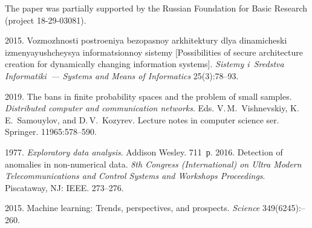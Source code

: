    
  



 \Ack
   \noindent
   The paper was partially supported by the Russian Foundation for Basic Research (project  
18-29-03081).



  \begin{multicols}{2}

\renewcommand{\bibname}{\protect\rmfamily References}

{\small\frenchspacing
 {%
 \begin{thebibliography}{9}

 2015. Vozmozhnosti 
postroeniya 
bezopasnoy arkhitektury dlya dinamicheski izmenyayushcheysya informatsionnoy sistemy 
[Possibilities of secure architecture creation for dynamically changing information systems]. 
\textit{Sistemy i~Sredstva Informatiki~--- Systems and Means of Informatics} 25(3):78--93.

 2019. 
The bans in finite probability spaces and 
the problem of small samples. \textit{Distributed computer and communication networks}.
Eds. V.\,M.~Vishnevskiy, 
K.\,E.~Samouylov, and D.\,V.~Kozyrev. Lecture notes
in computer science ser. Springer. 11965:578--590.



 1977. \textit{Exploratory data analysis}. Addison Wesley. 
711~р.
 2016. Detection of anomalies in non-numerical 
data. \textit{8th  Congress (International) on Ultra Modern Telecommunications and Control 
Systems and Workshops Proceedings}. Piscataway, NJ: IEEE. 273--276.

\vspace*{2pt}

 2015. 
Machine learning: Trends, perspectives, 
and prospects. \textit{Science} 349(6245):--260.


\end{thebibliography}}}
\end{multicols}
